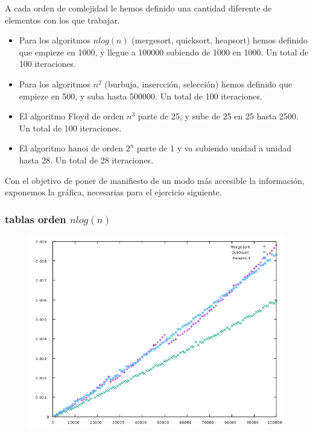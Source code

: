 \documentclass[compress]{beamer}
\begin{document}
\begin{frame}
	A cada orden de comlejidad le hemos definido una cantidad diferente de elementos con los que trabajar.
	\begin{itemize}
\item Para los algoritmos $nlog(n)$ (mergesort, quicksort, heapsort) hemos definido que empieze en 1000, y llegue a 100000 subiendo de 1000 en 1000. Un total de 100 iteraciones.
\item Para los algoritmos $n^2$ (burbuja, insercción, selección) hemos definido que empieze en 500, y suba hasta 500000. Un total de 100 iteraciones.
\item El algoritmo Floyd de orden $n^3$ parte de 25, y sube de 25 en 25 hasta 2500. Un total de 100 iteraciones.
\item El algoritmo hanoi de orden $2^n$ parte de 1 y va subiendo unidad a unidad hasta 28. Un total de 28 iteraciones.
\end{itemize}

Con el objetivo de poner de manifiesto de un modo más accesible la información, exponemos la gráfica, necesarias para el ejercicio siguiente.
\end{frame}
\begin{frame}
\frametitle{tablas orden $nlog(n)$}
	\begin{figure}
  \centering
    \includegraphics[width=1\textwidth]{nlogn.png}
  \label{fig:ejemplo}
\end{figure}
\end{frame}
\end{document}
